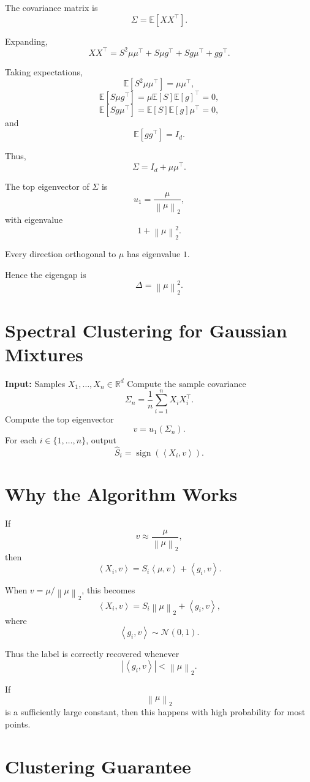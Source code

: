 \documentclass[12pt,oneside]{book}
\numberwithin{equation}{section}
\theoremstyle{definition}
\theoremstyle{plain}
\theoremstyle{remark}
\newcommand{\R}{\mathbb{R}}
\newcommand{\E}{\mathbb{E}}
\newcommand{\norm}[1]{\left\lVert #1 \right\rVert}
\newcommand{\inner}[2]{\left\langle #1, #2 \right\rangle}
\newcommand{\Normal}{\mathcal{N}}
\begin{document}
The covariance matrix is
\[
\Sigma
=
\E[XX^\top].
\]

Expanding,
\[
XX^\top
=
S^2\mu\mu^\top
+
S\mu g^\top
+
Sg\mu^\top
+
gg^\top.
\]

Taking expectations,
\[
\E[S^2\mu\mu^\top]=\mu\mu^\top,
\]
\[
\E[S\mu g^\top]=\mu\E[S]\E[g]^\top=0,
\]
\[
\E[Sg\mu^\top]=\E[S]\E[g]\mu^\top=0,
\]
and
\[
\E[gg^\top]=I_d.
\]

Thus,
\[
\Sigma
=
I_d+\mu\mu^\top.
\]

The top eigenvector of $\Sigma$ is
\[
u_1
=
\frac{\mu}{\norm{\mu}_2},
\]
with eigenvalue
\[
1+\norm{\mu}_2^2.
\]

Every direction orthogonal to $\mu$ has eigenvalue $1$.

Hence the eigengap is
\[
\Delta
=
\norm{\mu}_2^2.
\]

\section{Spectral Clustering for Gaussian Mixtures}

\begin{algorithm}[H]
\caption{Spectral Clustering for a Two-Component Gaussian Mixture}
\begin{algorithmic}[1]
\State \textbf{Input:} Samples $X_1,\dots,X_n\in\R^d$
\State Compute the sample covariance
\[
\Sigma_n=\frac{1}{n}\sum_{i=1}^n X_iX_i^\top.
\]
\State Compute the top eigenvector
\[
v=u_1(\Sigma_n).
\]
\State For each $i\in\{1,\dots,n\}$, output
\[
\widehat{S}_i=\operatorname{sign}(\inner{X_i}{v}).
\]
\end{algorithmic}
\end{algorithm}

\section{Why the Algorithm Works}

If
\[
v\approx \frac{\mu}{\norm{\mu}_2},
\]
then
\[
\inner{X_i}{v}
=
S_i\inner{\mu}{v}
+
\inner{g_i}{v}.
\]

When $v=\mu/\norm{\mu}_2$, this becomes
\[
\inner{X_i}{v}
=
S_i\norm{\mu}_2+\inner{g_i}{v},
\]
where
\[
\inner{g_i}{v}\sim \Normal(0,1).
\]

Thus the label is correctly recovered whenever
\[
|\inner{g_i}{v}|<\norm{\mu}_2.
\]

If
\[
\norm{\mu}_2
\]
is a sufficiently large constant, then this happens with high probability for most points.

\section{Clustering Guarantee}
\end{document}
